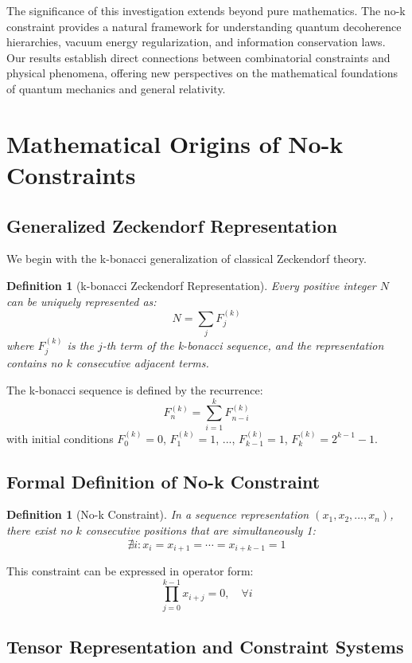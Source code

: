 \documentclass[12pt]{article}
\newtheorem{definition}[theorem]{Definition}
\begin{document}
The significance of this investigation extends beyond pure mathematics. The no-k constraint provides a natural framework for understanding quantum decoherence hierarchies, vacuum energy regularization, and information conservation laws. Our results establish direct connections between combinatorial constraints and physical phenomena, offering new perspectives on the mathematical foundations of quantum mechanics and general relativity.

\section{Mathematical Origins of No-k Constraints}

\subsection{Generalized Zeckendorf Representation}

We begin with the k-bonacci generalization of classical Zeckendorf theory.

\begin{definition}[k-bonacci Zeckendorf Representation]
Every positive integer $N$ can be uniquely represented as:
$$N = \sum_{j} F_j^{(k)}$$
where $F_j^{(k)}$ is the $j$-th term of the k-bonacci sequence, and the representation contains no $k$ consecutive adjacent terms.
\end{definition}

The k-bonacci sequence is defined by the recurrence:
$$F_n^{(k)} = \sum_{i=1}^{k} F_{n-i}^{(k)}$$
with initial conditions $F_0^{(k)} = 0$, $F_1^{(k)} = 1$, ..., $F_{k-1}^{(k)} = 1$, $F_k^{(k)} = 2^{k-1} - 1$.

\subsection{Formal Definition of No-k Constraint}

\begin{definition}[No-k Constraint]
In a sequence representation $(x_1, x_2, \ldots, x_n)$, there exist no $k$ consecutive positions that are simultaneously 1:
$$\nexists i : x_i = x_{i+1} = \cdots = x_{i+k-1} = 1$$
\end{definition}

This constraint can be expressed in operator form:
$$\prod_{j=0}^{k-1} x_{i+j} = 0, \quad \forall i$$

\subsection{Tensor Representation and Constraint Systems}
\end{document}
